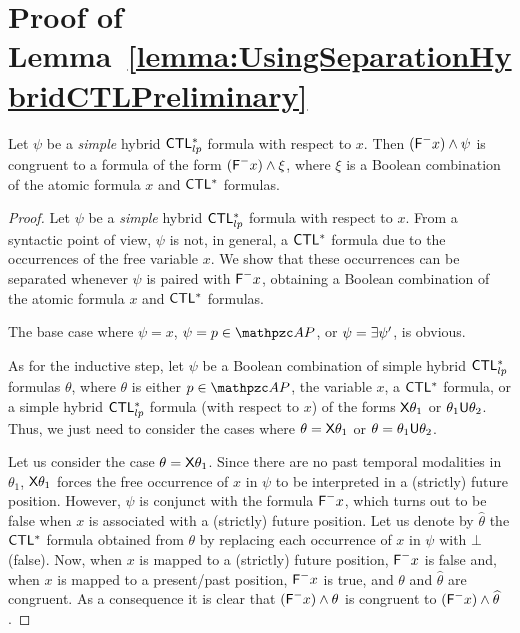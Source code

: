 \section{Proof of Lemma~\ref{lemma:UsingSeparationHybridCTLPreliminary}}\label{proof:lemma:UsingSeparationHybridCTLPreliminary}
%
\begin{lemma*}[\ref{lemma:UsingSeparationHybridCTLPreliminary}] 
Let $\psi$ be  a \emph{simple} hybrid $\text{\sffamily CTL$^{*}_{lp}$}$ formula  with respect to $x$. 
Then $(\textsf{F}^{-} x)\wedge \psi$ is congruent to a formula of the form $(\textsf{F}^{-} x)\wedge \xi$, where $\xi$ is a Boolean combination of the atomic formula $x$ and $\text{\sffamily CTL$^{*}$}$ formulas. 
\end{lemma*}

\begin{proof} Let  $\psi$ be  a \emph{simple} hybrid $\text{\sffamily CTL$^{*}_{lp}$}$ formula  with respect to $x$. From a syntactic point of view, $\psi$ is not, in general, a $\text{\sffamily CTL$^{*}$}$ formula due to the occurrences of the free variable $x$. We show that these occurrences can be separated whenever $\psi$ is paired with $\textsf{F}^{-} x$, obtaining a Boolean combination of the atomic formula $x$ and $\text{\sffamily CTL$^{*}$}$ formulas. 

The base case where $\psi=x$, $\psi=p\in\Prop$, or $\psi=\exists\psi'$, is obvious.

As for the inductive step, let $\psi$ be a Boolean combination of simple hybrid $\text{\sffamily CTL$^{*}_{lp}$}$ formulas $\theta$, where $\theta$ is either $p\in\Prop$, the variable $x$, a $\text{\sffamily CTL$^{*}$}$ formula, or a simple hybrid $\text{\sffamily CTL$^{*}_{lp}$}$ formula (with respect to $x$) of the forms $\textsf{X}\theta_1$ or 
$\theta_1\textsf{U} \theta_2$. Thus, we just need to consider the cases where $\theta =\textsf{X} \theta_1$ or $\theta =\theta_1\textsf{U} \theta_2$.

Let us consider the case $\theta =\textsf{X} \theta_1$. Since there are no past temporal modalities in $\theta_1$, 
$\textsf{X} \theta_1$ forces the free occurrence of $x$ in $\psi$ to be interpreted in a (strictly) future position. 
However, $\psi$ is conjunct with the formula $\textsf{F}^{-} x$, which turns out to be false when $x$ is associated with a (strictly) future position.  
%
Let us denote by $\widehat{\theta}$  the $\text{\sffamily CTL$^{*}$}$ formula obtained from $\theta$ by replacing each occurrence of $x$ in $\psi$ with $\bot$ (false).
%
Now, when $x$ is mapped to a (strictly) future position, $\textsf{F}^{-} x$ is false and, when $x$ is mapped to a present/past position, $\textsf{F}^{-} x$ is  true, and $\theta$ and $\widehat{\theta}$ are congruent.
As a consequence it is clear that $(\textsf{F}^{-} x)\wedge \theta$ is congruent to $(\textsf{F}^{-} x)\wedge  \widehat{\theta}$.


\end{proof}
